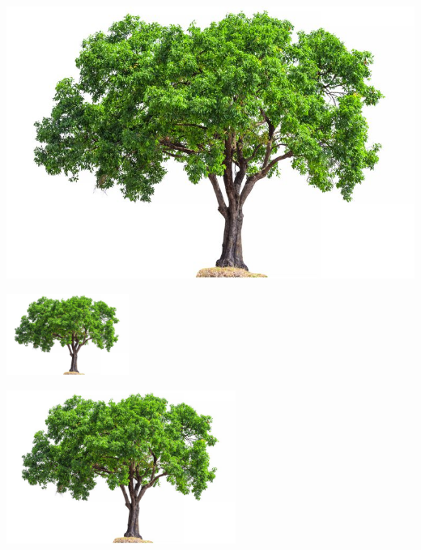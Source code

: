 \documentclass[12pt]{article}
\begin{document}
\begin{center}
\includegraphics[scale=.3]{figuras/tree.jpg}
\end{center}

\begin{center}
\includegraphics[width = 4cm]{figuras/tree.jpg}
\end{center}

\begin{center}
\includegraphics[height = 5cm]{figuras/tree.jpg}
\end{center}
\end{document}
